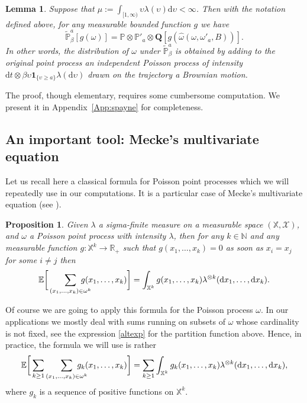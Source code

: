 \documentclass[10pt]{amsart}
\let\mathcal\mathscr
\newtheorem{lemma}[theorem]{Lemma}
\newtheorem{proposition}[theorem]{Proposition}
\theoremstyle{definition}
\newcommand{\dd}{\mathrm{d}}
\newcommand{\ind}{\mathbf{1}}
\newcommand{\bQ}{{\ensuremath{\mathbf Q}} }
\newcommand{\bbE}{{\ensuremath{\mathbb E}} }
\newcommand{\bbN}{{\ensuremath{\mathbb N}} }
\newcommand{\bbP}{{\ensuremath{\mathbb P}} }
\newcommand{\bbR}{{\ensuremath{\mathbb R}} }
\newcommand{\bbX}{{\ensuremath{\mathbb X}} }
\let\gl\lambda
\let\ups\upsilon
\let\go\omega
\begin{document}
\begin{lemma}\label{spayne}
Suppose that $\mu:=\int_{[1,\infty)} \ups \gl(\ups)\dd \ups<\infty$.
Then with the notation defined above, for any measurable bounded function $g$ we have
\begin{equation}\label{sides}
\tilde \bbP^a_{\beta}[ g(\go)]= \bbP\otimes \bbP'_a\otimes \bQ[ g(\hat \go(\go,\go'_a,B))].
\end{equation}
In other words, the distribution of $\go$ under $\tilde \bbP^a_{\beta}$ is obtained by adding to the original point process an independent Poisson process of intensity
$\dd t \otimes \beta\ups \ind_{\{\ups \geq a\}} \gl(\dd \ups)$ drawn on the trajectory a Brownian motion.
\end{lemma}
The proof, though elementary, requires some cumbersome computation. We present it in Appendix~\ref{App:spayne} for completeness.

\subsection{An important tool: Mecke's multivariate equation}

Let us recall here a classical formula for Poisson point processes which we will repeatedly use in our computations.
It is a particular case of Mecke's multivariate equation
(see \eg \cite[Th.\,4.4]{PoiBook}).

\begin{proposition}\label{OKLMecke}
Given $\gl$ a sigma-finite measure on a measurable space $(\bbX,\mathcal{X})$, and $\go$
a Poisson point process with intensity $\gl$, then
for any $k\in \bbN$ and any measurable function $g: \bbX^k \to \bbR_+$ such that $g (x_1,\dots, x_k)=0 $ as soon as $x_i=x_j$ for some $i\ne j$ then
\begin{equation}
\bbE \bigg[ \sum_{(x_1,\dots, x_k)\in \go^k}\hspace*{-5mm} g(x_1,\dots, x_k) \bigg]= \int_{\bbX^k} g(x_1,\dots,x_k) \gl^{\otimes k}(\dd x_1,\dots,\dd x_k).
\end{equation}

\end{proposition}
Of course we are going to apply this formula for the Poisson process $\go$. In our applications we mostly deal with sums running on subsets of $\go$ whose cardinality is not fixed, see the expression \eqref{altexp} for the partition function above. Hence, in practice, the formula we will use is rather
\begin{equation}\label{nonfixedcard}
\bbE \bigg[ \sum_{k\ge 1} \sum_{(x_1,\dots, x_k)\in \go^k}\hspace*{-5mm} g_k(x_1,\dots, x_k) \bigg]= \sum_{k\ge 1} \int_{\bbX^k} g_k(x_1,\dots,x_k) \gl^{\otimes k}(\dd x_1,\dots,\dd x_k),
\end{equation}
where $g_k$ is a sequence of positive functions on $\bbX^k$.
\end{document}

